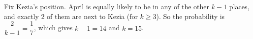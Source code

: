 Fix Kezia's position. April is equally likely to be in any of the other $k-1$ places, and exactly $2$ of them are next to Kezia (for $k\ge3$). So the probability is $\dfrac{2}{k-1}=\dfrac{1}{7}$, which gives $k-1=14$ and $k=\boxed{15}$.
